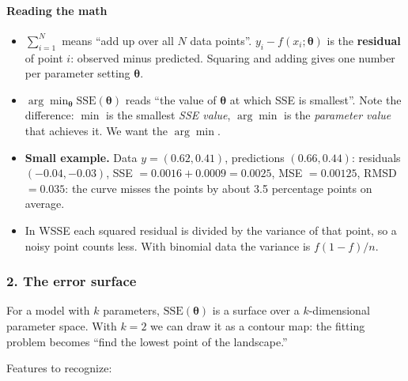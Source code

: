 \paragraph{Reading the math}

\begin{itemize}
\tightlist
\item
  \(\sum_{i=1}^{N}\) means ``add up over all \(N\) data points''.
  \(y_i - f(x_i;\boldsymbol\theta)\) is the \textbf{residual} of point
  \(i\): observed minus predicted. Squaring and adding gives one number
  per parameter setting \(\boldsymbol\theta\).
\item
  \(\arg\min_{\boldsymbol\theta} \mathrm{SSE}(\boldsymbol\theta)\) reads
  ``the value of \(\boldsymbol\theta\) at which SSE is smallest''. Note
  the difference: \(\min\) is the smallest \emph{SSE value},
  \(\arg\min\) is the \emph{parameter value} that achieves it. We want
  the \(\arg\min\).
\item
  \textbf{Small example.} Data \(y = (0.62, 0.41)\), predictions
  \((0.66, 0.44)\): residuals \((-0.04, -0.03)\), SSE
  \(= 0.0016 + 0.0009 = 0.0025\), MSE \(= 0.00125\), RMSD \(= 0.035\):
  the curve misses the points by about 3.5 percentage points on average.
\item
  In WSSE each squared residual is divided by the variance of that
  point, so a noisy point counts less. With binomial data the variance
  is \(f(1-f)/n\).
\end{itemize}

\subsubsection{2. The error surface}

For a model with \(k\) parameters, \(\mathrm{SSE}(\boldsymbol\theta)\)
is a surface over a \(k\)-dimensional parameter space. With \(k = 2\) we
can draw it as a contour map: the fitting problem becomes ``find the
lowest point of the landscape.''

Features to recognize:


